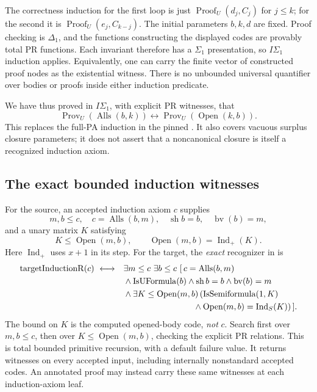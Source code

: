 The correctness induction for the first loop is just
$\operatorname{Proof}_U(d_j,C_j)$ for $j\le k$; for the second it is
$\operatorname{Proof}_U(e_j,C_{k-j})$.  The initial parameters $b,k,d$
are fixed.  Proof checking is $\Delta_1$, and the functions constructing
the displayed codes are provably total PR functions.  Each invariant
therefore has a $\Sigma_1$ presentation, so $I\Sigma_1$ induction applies.
Equivalently, one can carry the finite vector of constructed proof nodes
as the existential witness.  There is no unbounded universal quantifier
over bodies or proofs inside either induction predicate.

We have thus proved in $I\Sigma_1$, with explicit PR witnesses, that
\[
 \operatorname{Prov}_U(\operatorname{Alls}(b,k))
 \longleftrightarrow \operatorname{Prov}_U(\operatorname{Open}(k,b)) .\tag{OC}
\]
This replaces the full-PA induction in the pinned
.
It also covers vacuous surplus closure parameters; it does not assert
that a noncanonical closure is itself a recognized induction axiom.

\subsection{The exact bounded induction witnesses}

For the source, an accepted induction axiom $c$ supplies
\[
 m,b\le c,\quad c=\operatorname{Alls}(b,m),\quad
 \operatorname{sh}b=b,\quad\operatorname{bv}(b)=m,
\]
and a unary matrix $K$ satisfying
\[
 K\le\operatorname{Open}(m,b),\qquad
 \operatorname{Open}(m,b)=\operatorname{Ind}_{+}(K).
\]
Here $\operatorname{Ind}_{+}$ uses $x+1$ in its step.
For the target, the \emph{exact} recognizer in
 is
\begin{align*}
\operatorname{targetInductionR}(c)\ \longleftrightarrow\quad &\exists m\le c\ \exists b\le c\ [\,
  c=\operatorname{Alls}(b,m)\\
 &{}\land\operatorname{IsUFormula}(b)
   \land\operatorname{sh}b=b\land\operatorname{bv}(b)=m\\
 &{}\land\exists K\le\operatorname{Open}(m,b)\,
  (\operatorname{IsSemiformula}(1,K)\\
 &\hspace{29mm}{}\land
   \operatorname{Open}(m,b)=\operatorname{Ind}_{S}(K))\,].
\end{align*}
The bound on $K$ is the computed opened-body code, \emph{not} $c$.
Search first over $m,b\le c$, then over
$K\le\operatorname{Open}(m,b)$, checking the explicit PR relations.
This is total bounded primitive recursion, with a default failure value.
It returns witnesses on every accepted input, including internally
nonstandard accepted codes.  An annotated proof may instead carry these
same witnesses at each induction-axiom leaf.

